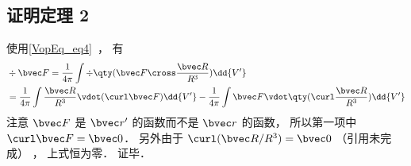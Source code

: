 \subsection{证明定理 2}
使用\autoref{VopEq_eq4}~， 有
\begin{equation}
\begin{aligned}
&\div \bvec F = \frac{1}{4\pi} \int \div \qty(\bvec F \cross \frac{\bvec R}{R^3}) \dd{V'}\\
&= \frac{1}{4\pi} \int \frac{\bvec R}{R^3} \vdot (\curl \bvec F)\dd{V'} - \frac{1}{4\pi} \int \bvec F \vdot \qty(\curl \frac{\bvec R}{R^3})\dd{V'}
\end{aligned}
\end{equation}
注意 $\bvec F$ 是 $\bvec r'$ 的函数而不是 $\bvec r$ 的函数， 所以第一项中 $\curl \bvec F = \bvec 0$． 另外由于 $\curl(\bvec R/R^3) = \bvec 0$ （引用未完成） ， 上式恒为零． 证毕．
